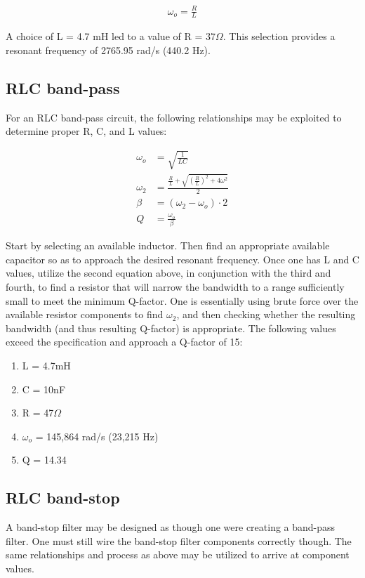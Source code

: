 \documentclass[journal]{IEEEtran}
\begin{document}
\begin{align*}
\omega_{o} = \frac{R}{L}
\end{align*}

A choice of L = 4.7 mH led to a value of R = $37\Omega$. This selection provides a resonant frequency of 2765.95 rad/s (440.2 Hz).

\subsection{RLC band-pass}

For an RLC band-pass circuit, the following relationships may be exploited to determine proper R, C, and L values:

\begin{align*}
\omega_{o} &= \sqrt{\frac{1}{LC}}\\
\omega_{2} &= \frac{\frac{R}{L} + \sqrt{\left(\frac{R}{L}\right)^{2} + 4\omega^{2}}}{2}\\
\beta &= \left(\omega_{2}-\omega_{o}\right)\cdot 2\\
Q &= \frac{\omega_{o}}{\beta}
\end{align*}

Start by selecting an available inductor. Then find an appropriate available capacitor so as to approach the desired resonant frequency. Once one has L and C values, utilize the second equation above, in conjunction with the third and fourth, to find a resistor that will narrow the bandwidth to a range  sufficiently small to meet the minimum Q-factor. One is essentially using brute force over the available resistor components to find $\omega_{2}$, and then checking whether the resulting bandwidth (and thus resulting Q-factor) is appropriate. The following values exceed the specification and approach a Q-factor of 15:

\begin{enumerate}
\item
L = 4.7mH
\item
C = 10nF
\item
R = 47$\Omega$
\item
$\omega_{o}$ = 145,864 rad/s (23,215 Hz)
\item
Q = 14.34
\end{enumerate}

\subsection{RLC band-stop}

A band-stop filter may be designed as though one were creating a band-pass filter. One must still wire the band-stop filter components correctly though. The same relationships and process as above may be utilized to arrive at component values.
\end{document}
